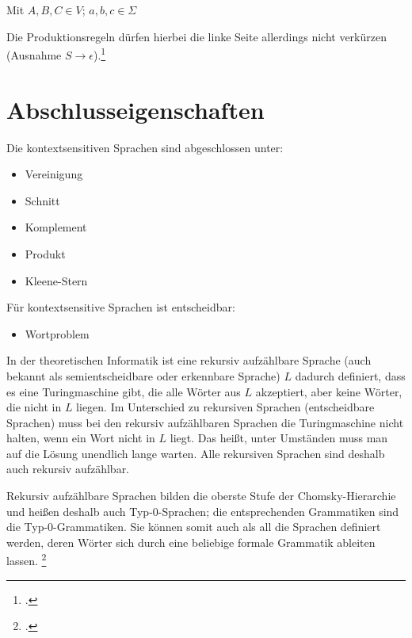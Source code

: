 \documentclass{lehramt-informatik-haupt}
\begin{document}
Mit $A,B,C \in V$; $a,b,c \in \Sigma$



Die Produktionsregeln dürfen hierbei die linke Seite allerdings nicht
verkürzen (Ausnahme $S \rightarrow \epsilon$).\footcite{theo:fs:3}

%

\section{Abschlusseigenschaften}

Die kontextsensitiven Sprachen sind abgeschlossen unter:

\begin{itemize}
\item Vereinigung
\item Schnitt
\item Komplement
\item Produkt
\item Kleene-Stern
\end{itemize}

Für kontextsensitive Sprachen ist entscheidbar:

\begin{itemize}
\item Wortproblem
\end{itemize}

In der theoretischen Informatik ist eine rekursiv aufzählbare Sprache
(auch bekannt als semientscheidbare oder erkennbare Sprache) $L$ dadurch
definiert, dass es eine Turingmaschine gibt, die alle Wörter aus $L$
akzeptiert, aber keine Wörter, die nicht in $L$ liegen. Im Unterschied
zu rekursiven Sprachen (entscheidbare Sprachen) muss bei den rekursiv
aufzählbaren Sprachen die Turingmaschine nicht halten, wenn ein Wort
nicht in $L$ liegt. Das heißt, unter Umständen muss man auf die Lösung
unendlich lange warten. Alle rekursiven Sprachen sind deshalb auch
rekursiv aufzählbar.

Rekursiv aufzählbare Sprachen bilden die oberste Stufe der
Chomsky-Hierarchie und heißen deshalb auch Typ-0-Sprachen; die
entsprechenden Grammatiken sind die Typ-0-Grammatiken. Sie können somit
auch als all die Sprachen definiert werden, deren Wörter sich durch eine
beliebige formale Grammatik ableiten lassen.
\footcite{wiki:rekursiv-aufzaehlbare-sprache}

\literatur
\end{document}
